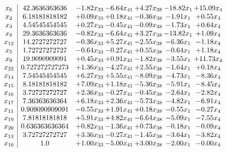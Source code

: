 \documentclass[8pt]{article}
\begin{document}
\[\begin{array}{c| c c@{\hskip 2pt} c@{\hskip 2pt} c@{\hskip 2pt} c@{\hskip 2pt} c@{\hskip 2pt} }
 x_{6}   &  42.3636363636 & -1.82 x_{33} & -6.64 x_{41} & +  4.27 x_{38} & -18.82 x_{1} & + 15.09 x_{4}\\
 x_{2}   &  6.18181818182 & +  0.09 x_{33} & +  0.18 x_{41} & -0.36 x_{38} & -1.91 x_{1} & +  0.55 x_{4}\\
 x_{3}   &  4.54545454545 & +  0.27 x_{33} & -0.45 x_{41} & -0.09 x_{38} & -1.73 x_{1} & +  0.64 x_{4}\\
 x_{8}   &  29.3636363636 & -0.82 x_{33} & -6.64 x_{41} & +  3.27 x_{38} & -13.82 x_{1} & +  1.09 x_{4}\\
 x_{12}   &  14.2727272727 & -0.36 x_{33} & +  5.27 x_{41} & -2.55 x_{38} & -6.36 x_{1} & -1.18 x_{4}\\
 x_{5}   &  1.72727272727 & -0.64 x_{33} & -0.27 x_{41} & +  0.55 x_{38} & -0.64 x_{1} & +  1.18 x_{4}\\
 x_{9}   &  19.9090909091 & +  0.45 x_{33} & +  0.91 x_{41} & -1.82 x_{38} & -3.55 x_{1} & + 11.73 x_{4}\\
 x_{22}   &  0.727272727273 & +  1.36 x_{33} & -4.27 x_{41} & +  2.55 x_{38} & -1.64 x_{1} & +  0.18 x_{4}\\
 x_{14}   &  7.54545454545 & +  6.27 x_{33} & +  5.55 x_{41} & -8.09 x_{38} & -4.73 x_{1} & -8.36 x_{4}\\
 x_{15}   &  8.18181818182 & +  7.09 x_{33} & +  1.18 x_{41} & -5.36 x_{38} & -5.91 x_{1} & -8.45 x_{4}\\
 x_{16}   &  3.72727272727 & +  2.36 x_{33} & -0.27 x_{41} & -0.45 x_{38} & -2.64 x_{1} & -2.82 x_{4}\\
 x_{17}   &  7.36363636364 & +  6.18 x_{33} & +  2.36 x_{41} & -5.73 x_{38} & -4.82 x_{1} & -6.91 x_{4}\\
 x_{11}   &  0.909090909091 & -0.55 x_{33} & +  1.91 x_{41} & +  0.18 x_{38} & -0.55 x_{1} & -0.27 x_{4}\\
 x_{19}   &  7.81818181818 & +  5.91 x_{33} & +  4.82 x_{41} & -6.64 x_{38} & -5.09 x_{1} & -7.55 x_{4}\\
 x_{20}   &  0.636363636364 & +  0.82 x_{33} & -1.36 x_{41} & +  0.73 x_{38} & -0.18 x_{1} & -0.09 x_{4}\\
 x_{13}   &  3.72727272727 & +  3.36 x_{33} & -0.27 x_{41} & -1.45 x_{38} & -3.64 x_{1} & -3.82 x_{4}\\
 x_{10}   &  1.0 & +  1.00 x_{33} & -5.00 x_{41} & +  3.00 x_{38} & -2.00 x_{1} & -0.00 x_{4}\\

\end{array}\]
\end{document}
